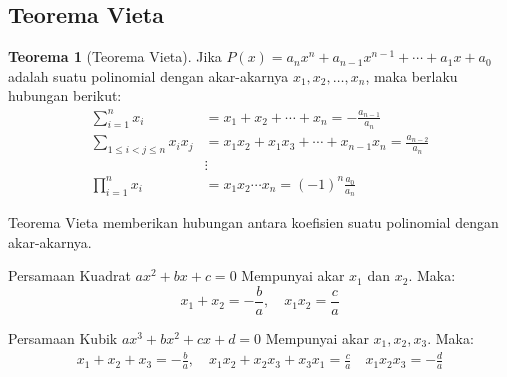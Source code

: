 \documentclass[aspectratio=169]{beamer}
\theoremstyle{definition}
\newtheorem{teorema}{Teorema}
\begin{document}
\subsection{Teorema Vieta}
\begin{frame}{\insertsection}{\insertsubsection}
  \begin{teorema}[Teorema Vieta]
    Jika $P(x) = a_n x^n + a_{n-1} x^{n-1} + \cdots + a_1 x + a_0$ adalah suatu polinomial dengan akar-akarnya $x_1, x_2, \ldots, x_n$, maka berlaku hubungan berikut:
    \begin{align*}
      \sum_{i=1}^n x_i                 & = x_1 + x_2 + \cdots + x_n = -\frac{a_{n-1}}{a_n}                \\
      \sum_{1 \le i < j \le n} x_i x_j & = x_1 x_2 + x_1 x_3 + \cdots + x_{n-1} x_n = \frac{a_{n-2}}{a_n} \\
                                       & \vdots                                                           \\
      \prod_{i=1}^n x_i                & = x_1 x_2 \cdots x_n = (-1)^n \frac{a_0}{a_n}
    \end{align*}
  \end{teorema}
\end{frame}

\begin{frame}{\insertsection}{\insertsubsection}
  Teorema Vieta memberikan hubungan antara koefisien suatu polinomial dengan akar-akarnya.
  \begin{block}{Persamaan Kuadrat $ax^2+bx+c=0$}
    Mempunyai akar $x_1$ dan $x_2$. Maka:
    \[ x_1 + x_2 = -\frac{b}{a}, \quad x_1 x_2 = \frac{c}{a} \]
  \end{block}
  \begin{block}{Persamaan Kubik $ax^3+bx^2+cx+d=0$}
    Mempunyai akar $x_1, x_2, x_3$. Maka:
    \begin{align*}
      x_1 + x_2 + x_3              = -\frac{b}{a},\quad
      x_1 x_2 + x_2 x_3 + x_3 x_1  = \frac{c}{a}  \quad
      x_1 x_2 x_3                  = -\frac{d}{a}
    \end{align*}
  \end{block}
\end{frame}
\end{document}

